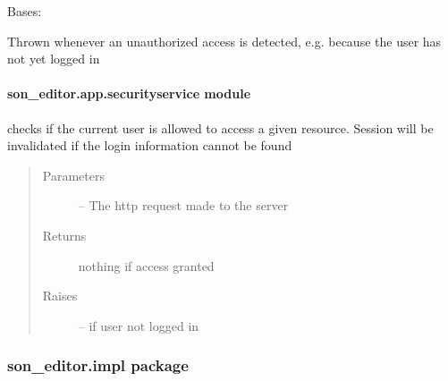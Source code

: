 \documentclass[letterpaper,10pt,english]{sphinxmanual}
\begin{document}
\begin{fulllineitems}
\label{_source/son_editor.app:son_editor.app.exceptions.UnauthorizedException}
Bases: 

Thrown whenever an unauthorized access is detected, e.g. because the user has not yet logged in

\end{fulllineitems}



\paragraph{son\_editor.app.securityservice module}
\label{_source/son_editor.app:module-son_editor.app.securityservice}\label{_source/son_editor.app:son-editor-app-securityservice-module}

\begin{fulllineitems}
\label{_source/son_editor.app:son_editor.app.securityservice.check_access}
checks if the current user is allowed to access a given resource.
Session will be invalidated if the login information cannot be found
\begin{quote}\begin{description}
\item[{Parameters}] \leavevmode
{} -- The http request made to the server

\item[{Returns}] \leavevmode
nothing if access granted

\item[{Raises}] \leavevmode
{\hyperref[_source/son_editor.app:son_editor.app.exceptions.UnauthorizedException]{}} -- if user not logged in

\end{description}\end{quote}

\end{fulllineitems}



\subsubsection{son\_editor.impl package}
\label{_source/son_editor.impl:son-editor-impl-package}\label{_source/son_editor.impl::doc}
\end{document}

